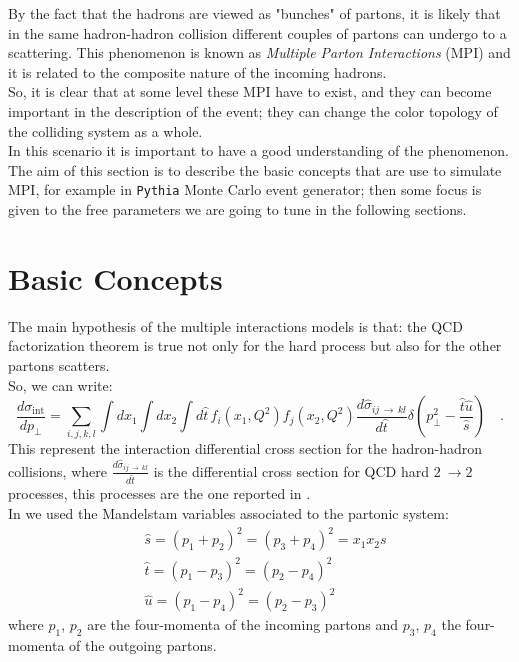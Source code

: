 By the fact that the hadrons are viewed as "bunches" of partons, it is likely that in the same hadron-hadron collision different couples of partons can undergo to a scattering. This phenomenon is known as \textit{Multiple Parton Interactions} (MPI) and it is related to the composite nature of the incoming hadrons. 
\\
So, it is clear that at some level these MPI have to exist, and they can become important in the description of the event; they can change the color topology of the colliding system as a whole.  
\\
In this scenario it is important to have a good understanding of the phenomenon. The aim of this section is to describe the basic concepts that are use to simulate MPI, for example in \texttt{Pythia} Monte Carlo event generator; then some focus is given to the free parameters we are going to tune in the following sections.

\section{Basic Concepts}
\label{sec:BasicConcepts}

The main hypothesis of the multiple interactions models is that: the QCD factorization theorem is true not only for the hard process but also for the other partons scatters.
\\
So, we can write:
\begin{equation}
	\frac{d\sigma_{\text{int}}}{dp_\perp}=\displaystyle\sum_{i,j,k,l}\displaystyle\int dx_1 \displaystyle\int dx_2 \displaystyle\int d\hat{t}\, f_i(x_1,Q^2)f_j(x_2,Q^2)\frac{d\hat{\sigma}_{ij\,\rightarrow\,kl}}{d\hat{t}}\delta\left( p_\perp^2-\frac{\hat{t}\hat{u}}{\hat{s}} \right) \quad .
	\label{eq:sigma_int1}
\end{equation}
This represent the interaction differential cross section for the hadron-hadron collisions, where $\frac{d\hat{\sigma}_{ij\,\rightarrow\,kl}}{d\hat{t}}$ is the differential cross section for QCD hard $2\ \rightarrow 2$ processes, this processes are the one reported in . 
\\
In  we used the Mandelstam variables associated to the partonic system:
\begin{align}
	&\hat{s}=(p_1+p_2)^2=(p_3+p_4)^2=x_1x_2s\\
	&\hat{t}=(p_1-p_3)^2=(p_2-p_4)^2\\
	&\hat{u}=(p_1-p_4)^2=(p_2-p_3)^2
\end{align} 
where $p_1$, $p_2$ are the four-momenta of the incoming partons and $p_3$, $p_4$ the four-momenta of the outgoing partons. 

